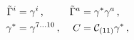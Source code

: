 \begin{equation}
\begin{aligned}
\label{clif1}
\tilde{\Gamma}^{i} &= \gamma^{i} \,, & 
\tilde{\Gamma}^{a} &= \gamma^{*}\gamma^{a}\,,  \\
\gamma^{*} &= \gamma^{7\ldots 10}\,, & 
C &= {\cal C}_{(11)}\gamma^* \,,
\end{aligned}
\end{equation}

